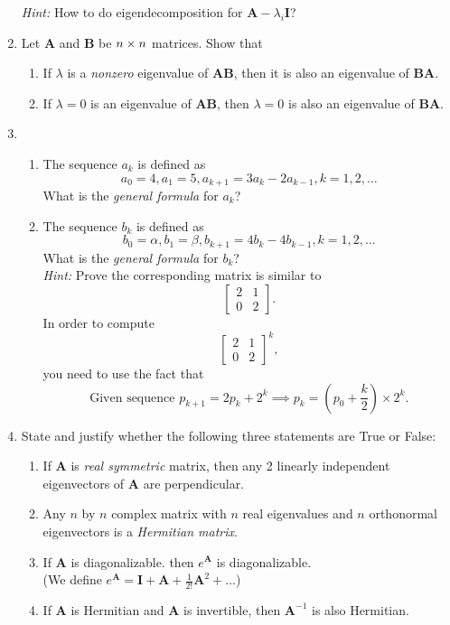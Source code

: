 \begin{enumerate}
\textit{Hint:} How to do eigendecomposition for $\bm A-\lambda_i\bm I$?
\item
Let $\bm A$ and $\bm B$ be $n\times n$ matrices. Show that
\begin{enumerate}
\item
If $\lambda$ is a \emph{nonzero} eigenvalue of $\bm{AB}$, then it is also an eigenvalue of $\bm{BA}$.
\item
If $\lambda=0$ is an eigenvalue of $\bm{AB}$, then $\lambda=0$ is also an eigenvalue of $\bm{BA}$.
\end{enumerate}
\item
\begin{enumerate}
\item
The sequence $a_k$ is defined as
\[
a_0=4,a_1=5,a_{k+1}=3a_k-2a_{k-1},k=1,2,\dots
\]
What is the \textit{general formula} for $a_k$?
\item
The sequence $b_k$ is defined as
\[
b_0=\alpha,b_1=\beta,b_{k+1}=4b_k-4b_{k-1},k=1,2,\dots
\]
What is the \textit{general formula} for $b_k$?\\
\textit{Hint:} Prove the corresponding matrix is similar to
\[
\begin{bmatrix}
2&1\\0&2
\end{bmatrix}.
\]
In order to compute
\[
\begin{bmatrix}
2&1\\0&2
\end{bmatrix}^k,
\]
you need to use the fact that
\[
\text{Given sequence }p_{k+1}=2p_{k}+2^k
\implies
p_k=(p_0+\frac{k}{2})\times2^k.
\]
\end{enumerate}
\item
State and justify whether the following three statements are True or False:
\begin{enumerate}
\item
If $\bm A$ is \textit{real symmetric} matrix, then any 2 linearly independent eigenvectors of $\bm A$ are perpendicular.
\item
Any $n$ by $n$ complex matrix with $n$ real eigenvalues and $n$ orthonormal eigenvectors
is a \textit{Hermitian matrix}.
\item
If $\bm A$ is diagonalizable. then $e^{\bm A}$ is diagonalizable.\\
(We define $e^{\bm A}=\bm I+\bm A+\frac{1}{2!}\bm A^2+\dots$)
\item
If $\bm A$ is Hermitian and $\bm A$ is invertible, then $\bm A^{-1}$ is also Hermitian.
\end{enumerate}

\end{enumerate}
